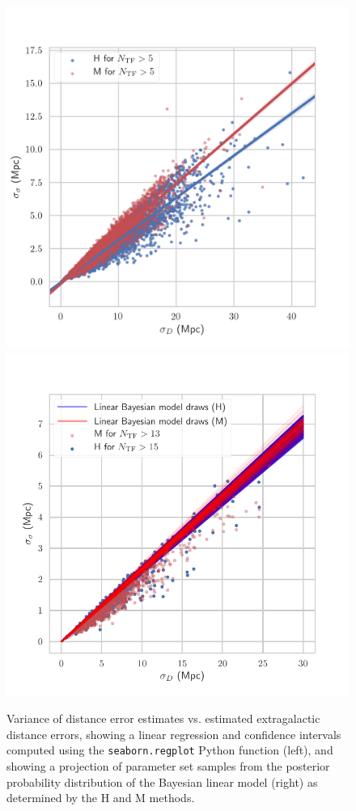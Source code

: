 \documentclass[a4paper,fleqn,usenatbib]{mnras}
\begin{document}
\begin{figure}
	\includegraphics[scale=0.69]{ee.png}
	\includegraphics[scale=0.69]{drawsee}
    \caption{Variance of distance error estimates vs. estimated extragalactic distance errors, showing a linear regression and confidence intervals computed using the \texttt{seaborn.regplot} Python function (left), and showing a projection of parameter set samples from the posterior probability distribution of the Bayesian linear model (right) as determined by the H and M methods.}
    \label{fig:drawsee}
\end{figure}
\end{document}
